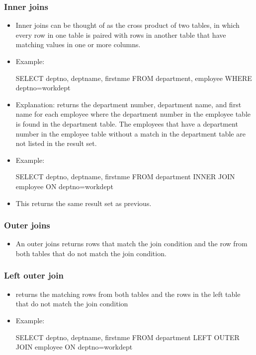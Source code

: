 \documentclass{article}
\begin{document}
\subsubsection*{Inner joins}
\begin{itemize}
\item Inner joins can be thought of as the cross product of two tables, in which every row in one table
is paired with rows in another table that have matching values in one or more columns.
\item Example: 
\begin{sqlcode}
SELECT deptno, deptname, firstnme FROM department, employee WHERE deptno=workdept
\end{sqlcode}
\item Explanation: returns the department number, department name, and first name for each employee
where the department number in the employee table is found in the department table. The employees
that have a department number in the employee table without a match in the department table are
not listed in the result set.
\item Example:
\begin{sqlcode}
SELECT deptno, deptname, firstnme FROM department INNER JOIN employee ON deptno=workdept
\end{sqlcode}
\item This returns the same result set as previous.
\end{itemize}

\subsubsection*{Outer joins}
\begin{itemize}
\item An outer joins returns rows that match the join condition and the row from both tables that
do not match the join condition.
\end{itemize}

\subsubsection*{Left outer join}
\begin{itemize}
\item returns the matching rows from both tables and the rows in the left
table that do not match the join condition
\item Example:
\begin{sqlcode}
SELECT deptno, deptname, firstnme FROM department LEFT OUTER JOIN employee ON deptno=workdept
\end{sqlcode}
\end{itemize}
\end{document}
